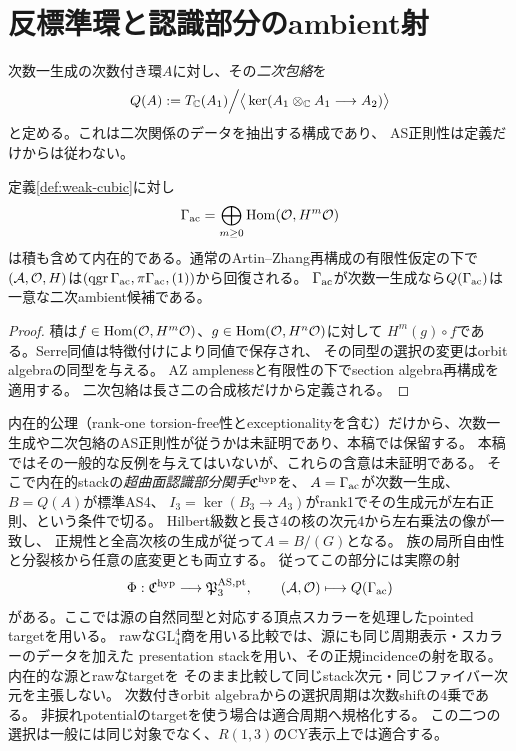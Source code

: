 \section{反標準環と認識部分のambient射}
次数一生成の次数付き環$A$に対し、その\emph{二次包絡}を
\[
 Q(A):=T_\mathbb C(A_1)\Big/
 \big\langle\ker(A_1\otimes_\mathbb C A_1\longrightarrow A_2)\big\rangle
\]
と定める。これは二次関係のデータを抽出する構成であり、
AS正則性は定義だけからは従わない。

\begin{proposition}[反標準環とambient候補]\label{prop:intrinsic-ring}
定義\ref{def:weak-cubic}に対し
\[
 \Gamma_{\rm ac}=\bigoplus_{m\ge0}\operatorname{Hom}(\mathcal O,H^m\mathcal O)
\]
は積も含めて内在的である。通常のArtin--Zhang再構成の有限性仮定の下で
$(\mathcal A,\mathcal O,H)$は$(\operatorname{qgr}\Gamma_{\rm ac},\pi\Gamma_{\rm ac},(1))$から回復される。
$\Gamma_{\rm ac}$が次数一生成なら$Q(\Gamma_{\rm ac})$は一意な二次ambient候補である。
\end{proposition}
\begin{proof}
積は$f\in\operatorname{Hom}(\mathcal O,H^m\mathcal O)$、$g\in\operatorname{Hom}(\mathcal O,H^n\mathcal O)$に対して
$H^m(g)\circ f$である。Serre同値は特徴付けにより同値で保存され、
その同型の選択の変更はorbit algebraの同型を与える。
AZ amplenessと有限性の下でsection algebra再構成\cite{AZ}を適用する。
二次包絡は長さ二の合成核だけから定義される。
\end{proof}

内在的公理（rank-one torsion-free性とexceptionalityを含む）だけから、次数一生成や二次包絡のAS正則性が従うかは未証明であり、本稿では保留する。
本稿ではその一般的な反例を与えてはいないが、これらの含意は未証明である。
そこで内在的stackの\emph{超曲面認識部分関手}$\mathfrak C^{\rm hyp}$を、
$A=\Gamma_{\rm ac}$が次数一生成、$B=Q(A)$が標準AS4、
$I_3=\ker(B_3\to A_3)$がrank1でその生成元が左右正則、という条件で切る。
Hilbert級数と長さ4の核の次元4から左右乗法の像が一致し、
正規性と全高次核の生成が従って$A=B/(G)$となる。
族の局所自由性と分裂核から任意の底変更とも両立する。
従ってこの部分には実際の射
\begin{equation}\label{eq:ambient-map}
 \Phi:\mathfrak C^{\rm hyp}\longrightarrow\mathfrak P^{\rm AS,pt}_3,
 \qquad(\mathcal A,\mathcal O)\longmapsto Q(\Gamma_{\rm ac})
\end{equation}
がある。ここでは源の自然同型と対応する頂点スカラーを処理したpointed targetを用いる。
rawな$\mathrm{GL}_4^4$商を用いる比較では、源にも同じ周期表示・スカラーのデータを加えた
presentation stackを用い、その正規incidenceの射を取る。内在的な源とrawなtargetを
そのまま比較して同じstack次元・同じファイバー次元を主張しない。
次数付きorbit algebraからの選択周期は次数shiftの4乗である。
非捩れpotentialのtargetを使う場合は適合周期へ規格化する。
この二つの選択は一般には同じ対象でなく、$R(1,3)$のCY表示上では適合する。

